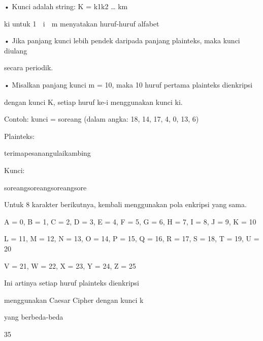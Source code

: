 \documentclass{article}
\begin{document}

• Kunci adalah string: K = k1k2 … km

 ki untuk 1  i  m menyatakan huruf-huruf alfabet 

• Jika panjang kunci lebih pendek daripada panjang plainteks, maka kunci diulang  

secara periodik. 

• Misalkan panjang kunci m = 10, maka 10 huruf pertama plainteks dienkripsi 

dengan kunci K, setiap huruf ke-i menggunakan kunci ki. 

   Contoh: kunci = soreang       (dalam angka: 18, 14, 17, 4, 0, 13, 6)

 Plainteks: 

terimapesanangulaikambing

 Kunci: 

soreangsoreangsoreangsore

 Untuk 8 karakter berikutnya, kembali menggunakan pola enkripsi yang sama.

A = 0,  B = 1, C = 2,  D = 3,  E = 4,  F = 5,  G = 6,  H = 7,  I = 8,  J = 9,  K = 10

L = 11, M = 12, N = 13, O = 14, P = 15, Q = 16, R = 17, S = 18, T = 19, U = 20

V = 21, W = 22, X = 23, Y = 24, Z = 25

Ini artinya setiap huruf plainteks dienkripsi 

menggunakan Caesar Cipher dengan kunci k 

yang berbeda-beda

35
\end{document}
